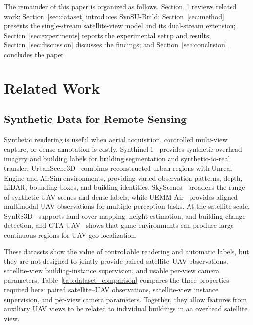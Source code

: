 \documentclass[letterpaper,journal]{IEEEtran}
\begin{document}
The remainder of this paper is organized as follows. Section~\ref{sec:related} reviews related
work; Section~\ref{sec:dataset} introduces SynSU-Build; Section~\ref{sec:method} presents the
single-stream satellite-view model and its dual-stream extension; Section~\ref{sec:experiments}
reports the experimental setup and results; Section~\ref{sec:discussion} discusses the
findings; and Section~\ref{sec:conclusion} concludes the paper.

\section{Related Work}
\label{sec:related}

\subsection{Synthetic Data for Remote Sensing}
Synthetic rendering is useful when aerial acquisition, controlled multi-view capture, or dense
annotation is costly. Synthinel-1~\cite{ref_synthinel} provides synthetic overhead imagery and
building labels for building segmentation and synthetic-to-real transfer.
UrbanScene3D~\cite{ref_urbanscene3d} combines reconstructed urban regions with Unreal Engine
and AirSim environments, providing varied observation patterns, depth, LiDAR, bounding boxes,
and building identities. SkyScenes~\cite{ref_skyscenes} broadens the range of synthetic UAV
scenes and dense labels, while UEMM-Air~\cite{ref_uemmair} provides aligned multimodal UAV
observations for multiple perception tasks. At the satellite scale, SynRS3D~\cite{ref_synrs3d}
supports land-cover mapping, height estimation, and building change detection, and
GTA-UAV~\cite{ref_gtauav} shows that game environments can produce large continuous regions for
UAV geo-localization.

These datasets show the value of controllable rendering and automatic labels, but they are not
designed to jointly provide paired satellite--UAV observations, satellite-view building-instance
supervision, and usable per-view camera parameters. Table~\ref{tab:dataset_comparison} compares
the three properties required here: paired satellite--UAV observations, satellite-view instance
supervision, and per-view camera parameters. Together, they allow features from auxiliary UAV
views to be related to individual buildings in an overhead satellite view.
\end{document}
